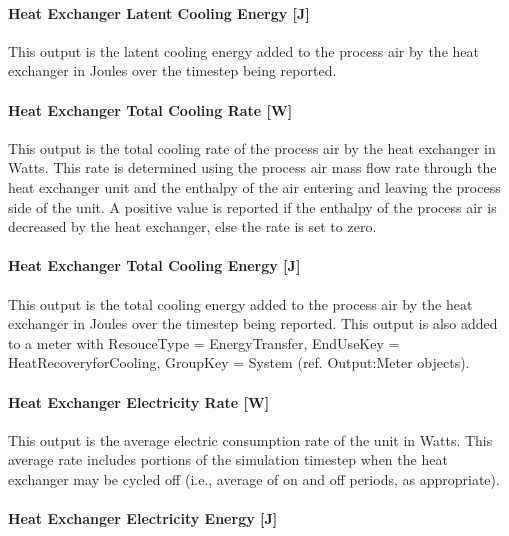 \paragraph{Heat Exchanger Latent Cooling Energy {[}J{]}}\label{heat-exchanger-latent-cooling-energy-j-2}

This output is the latent cooling energy added to the process air by the heat exchanger in Joules over the timestep being reported.

\paragraph{Heat Exchanger Total Cooling Rate {[}W{]}}\label{heat-exchanger-total-cooling-rate-w-2}

This output is the total cooling rate of the process air by the heat exchanger in Watts. This rate is determined using the process air mass flow rate through the heat exchanger unit and the enthalpy of the air entering and leaving the process side of the unit. A positive value is reported if the enthalpy of the process air is decreased by the heat exchanger, else the rate is set to zero.

\paragraph{Heat Exchanger Total Cooling Energy {[}J{]}}\label{heat-exchanger-total-cooling-energy-j-2}

This output is the total cooling energy added to the process air by the heat exchanger in Joules over the timestep being reported. This output is also added to a meter with ResouceType = EnergyTransfer, EndUseKey = HeatRecoveryforCooling, GroupKey = System (ref. Output:Meter objects).

\paragraph{Heat Exchanger Electricity Rate {[}W{]}}\label{heat-exchanger-electric-power-w-2}

This output is the average electric consumption rate of the unit in Watts. This average rate includes portions of the simulation timestep when the heat exchanger may be cycled off (i.e., average of on and off periods, as appropriate).

\paragraph{Heat Exchanger Electricity Energy {[}J{]}}\label{heat-exchanger-electric-energy-j-2}

